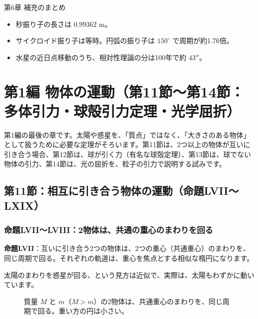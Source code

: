 \documentclass[a4paper,11pt,openany]{ltjsbook}
\begin{document}
\begin{pointbox}{第6章 補充のまとめ}
\begin{itemize}[leftmargin=*]
\item 秒振り子の長さは $0.99362$ m。
\item サイクロイド振り子は等時。円弧の振り子は $150^\circ$ で周期が約1.76倍。
\item 水星の近日点移動のうち、相対性理論の分は100年で約 $43''$。
\end{itemize}
\end{pointbox}

\chapter{第1編 物体の運動（第11節〜第14節：多体引力・球殻引力定理・光学屈折）}

第1編の最後の章です。太陽や惑星を、「質点」ではなく、「大きさのある物体」として扱うために必要な定理がそろいます。第11節は、2つ以上の物体が互いに引き合う場合、第12節は、球が引く力（有名な球殻定理）、第13節は、球でない物体の引力、第14節は、光の屈折を、粒子の引力で説明する試みです。

\section{第11節：相互に引き合う物体の運動（命題LVII〜LXIX）}

\subsection{命題LVII〜LVIII：2物体は、共通の重心のまわりを回る}

\textbf{命題LVII}：互いに引き合う2つの物体は、2つの重心（共通重心）のまわりを、同じ周期で回る。それぞれの軌道は、重心を焦点とする相似な楕円になります。

太陽のまわりを惑星が回る、という見方は近似で、実際は、太陽もわずかに動いています。

\begin{figure}[htbp]
\centering
{}
\caption{質量 $M$ と $m$（$M>m$）の2物体は、共通重心のまわりを、同じ周期で回る。重い方の円は小さい。}
\end{figure}
\end{document}
